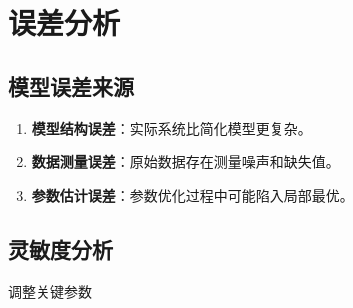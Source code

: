 \newpage
\section{误差分析}

\subsection{模型误差来源}
\begin{enumerate}
    \item[(1)] \textbf{模型结构误差}：实际系统比简化模型更复杂。
    \item[(2)] \textbf{数据测量误差}：原始数据存在测量噪声和缺失值。
    \item[(3)] \textbf{参数估计误差}：参数优化过程中可能陷入局部最优。
\end{enumerate}

\subsection{灵敏度分析}
调整关键参数%
